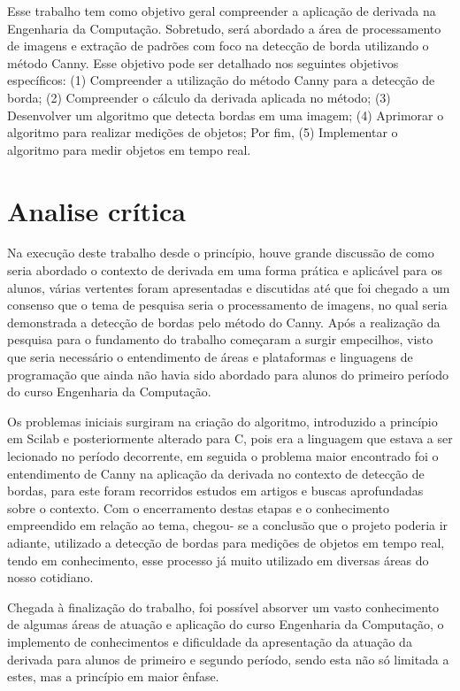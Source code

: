 \documentclass[12pt]{article}
\begin{document}
	Esse trabalho tem como objetivo geral compreender a aplicação de derivada na Engenharia da Computação. Sobretudo, será abordado a área de processamento de imagens e extração de padrões com foco na detecção de borda utilizando o método Canny. Esse objetivo pode ser detalhado nos seguintes objetivos específicos: (1) Compreender a utilização do método Canny para a detecção de borda; (2) Compreender o cálculo da derivada aplicada no método; (3) Desenvolver um algoritmo que detecta bordas em uma imagem;  (4) Aprimorar o algoritmo para realizar medições de objetos; Por fim, (5) Implementar o algoritmo para medir objetos em tempo real.
	
	
	\section{Analise crítica} \label{sec:firstpage}
	
	Na execução deste trabalho desde o princípio, houve grande discussão de como seria abordado o contexto de derivada em uma forma prática e aplicável para os alunos, várias vertentes foram apresentadas e discutidas até que foi chegado a um consenso que o tema de pesquisa seria o processamento de imagens, no qual seria demonstrada a detecção de bordas pelo método do Canny. Após a realização da pesquisa para o fundamento do trabalho começaram a surgir empecilhos, visto que seria necessário o entendimento de áreas e plataformas e linguagens de programação que ainda não havia sido abordado para alunos do primeiro período do curso Engenharia da Computação.
	
	Os problemas iniciais surgiram na criação do algoritmo, introduzido a princípio em Scilab e posteriormente alterado para C, pois era a linguagem que estava a ser lecionado no período decorrente, em seguida o problema maior encontrado foi o entendimento de Canny na aplicação da derivada no contexto de detecção de bordas, para este foram recorridos estudos em artigos e buscas aprofundadas sobre o contexto. Com o encerramento destas etapas e o conhecimento empreendido em relação ao tema, chegou- se a conclusão que o projeto poderia ir adiante, utilizado a detecção de bordas para medições de objetos em tempo real, tendo em conhecimento, esse processo já muito utilizado em diversas áreas do nosso cotidiano. 
	
	Chegada à finalização do trabalho, foi possível absorver um vasto conhecimento de algumas áreas de atuação e aplicação do curso Engenharia da Computação, o implemento de conhecimentos e dificuldade da apresentação da atuação da derivada para alunos de primeiro e segundo período, sendo esta não só limitada a estes, mas a princípio em maior ênfase.
	
\end{document}
